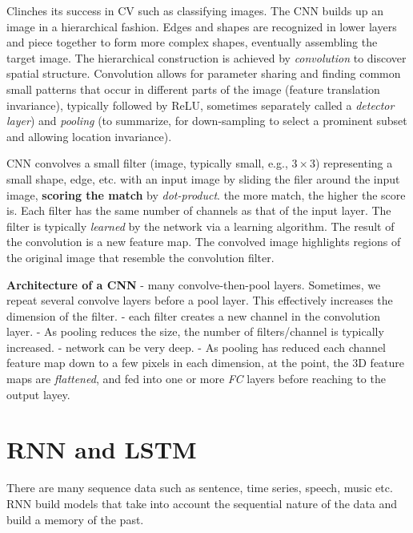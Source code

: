 \documentclass[
  letterpaper,
  DIV=11,
  numbers=noendperiod]{scrreprt}
\begin{document}
Clinches its success in CV such as classifying images. The CNN builds up
an image in a hierarchical fashion. Edges and shapes are recognized in
lower layers and piece together to form more complex shapes, eventually
assembling the target image. The hierarchical construction is achieved
by \emph{convolution} to discover spatial structure. Convolution allows
for parameter sharing and finding common small patterns that occur in
different parts of the image (feature translation invariance), typically
followed by ReLU, sometimes separately called a \emph{detector layer})
and \emph{pooling} (to summarize, for down-sampling to select a
prominent subset and allowing location invariance).

CNN convolves a small filter (image, typically small, e.g.,
\(3\times 3\)) representing a small shape, edge, etc. with an input
image by sliding the filer around the input image, \textbf{scoring the
match} by \emph{dot-product}. the more match, the higher the score is.
Each filter has the same number of channels as that of the input layer.
The filter is typically \emph{learned} by the network via a learning
algorithm. The result of the convolution is a new feature map. The
convolved image highlights regions of the original image that resemble
the convolution filter.

\textbf{Architecture of a CNN} - many convolve-then-pool layers.
Sometimes, we repeat several convolve layers before a pool layer. This
effectively increases the dimension of the filter. - each filter creates
a new channel in the convolution layer. - As pooling reduces the size,
the number of filters/channel is typically increased. - network can be
very deep. - As pooling has reduced each channel feature map down to a
few pixels in each dimension, at the point, the 3D feature maps are
\emph{flattened}, and fed into one or more \emph{FC} layers before
reaching to the output layey.

\section{RNN and LSTM}\label{rnn-and-lstm}

There are many sequence data such as sentence, time series, speech,
music etc. RNN build models that take into account the sequential nature
of the data and build a memory of the past.
\end{document}
